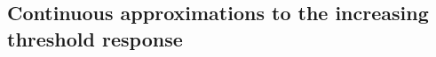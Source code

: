 \documentclass{article}
\begin{document}


\subsection{Continuous approximations to the increasing threshold response}
\end{document}
